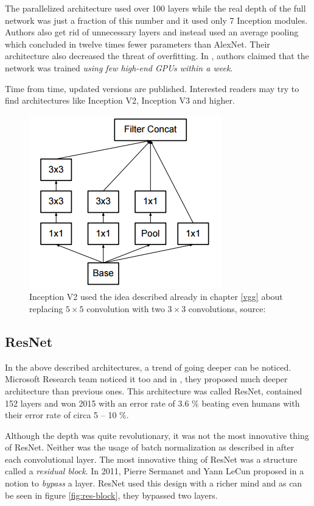 The parallelized architecture used over 100 layers while the real depth of the 
full network was just a fraction of this number and it used only 7 Inception 
modules. Authors also get rid of unnecessary  layers and instead used an 
average pooling which concluded in twelve times fewer parameters than AlexNet. 
Their architecture also decreased the threat of overfitting. In 
\cite{googlenet}, authors claimed that the network was trained \textit{using few 
high-end GPUs within a week}.

Time from time, updated versions are published. Interested readers may try to 
find architectures like Inception V2, Inception V3 and higher.

\begin{figure}[H]
   \centering
	\includegraphics[width=0.3\linewidth]{./pictures/inception-v2.png}
	\caption[Inception V2]{Inception V2 used the idea described already in chapter 
\ref{vgg} about replacing $5 \times 5$ convolution with two $3 \times 3$ 
convolutions, source: \cite{inception-v2}}
      \label{fig:inception-v2}
\end{figure}


\subsection{ResNet}
\label{resnet}

In the above described architectures, a trend of going deeper can be noticed. 
Microsoft Research team noticed it too and in \cite{resnet}, they proposed much 
deeper architecture than previous ones. This architecture was called ResNet, 
contained 152 layers and won  2015 with an error rate of 3.6 \% 
beating even humans with their error rate of circa 5 -- 10 \%.

Although the depth was quite revolutionary, it was not the most innovative thing 
of ResNet. Neither was the usage of batch normalization as described in 
\cite{batch-norm} after each convolutional layer. The most innovative thing of 
ResNet was a structure called a \textit{residual block}. In 2011, Pierre 
Sermanet and Yann LeCun proposed in \cite{bypass} a notion to \textit{bypass} a 
layer. ResNet used this design with a richer mind and as can be seen in figure 
\ref{fig:res-block}, they bypassed two layers.

